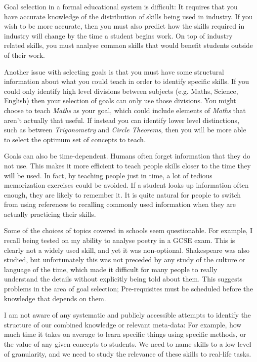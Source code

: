       Goal selection in a formal educational system is difficult: It requires that you have accurate knowledge of the distribution of skills being used in industry. If you wish to be more accurate, then you must also predict how the skills required in industry will change by the time a student begins work. On top of industry related skills, you must analyse common skills that would benefit students outside of their work.

      Another issue with selecting goals is that you must have some structural information about what you could teach in order to identify specific skills. If you could only identify high level divisions between subjects (e.g. Maths, Science, English) then your selection of goals can only use those divisions. You might choose to teach \emph{Maths} as your goal, which could include elements of \emph{Maths} that aren't actually that useful. If instead you can identify lower level distinctions, such as between \emph{Trigonometry} and \emph{Circle Theorems}, then you will be more able to select the optimum set of concepts to teach.

      Goals can also be time-dependent. Humans often forget information that they do not use. This makes it more efficient to teach people skills closer to the time they will be used. In fact, by teaching people just in time, a lot of tedious memorization exercises could be avoided. If a student looks up information often enough, they are likely to remember it. It is quite natural for people to switch from using references to recalling commonly used information when they are actually practicing their skills.

      Some of the choices of topics covered in schools seem questionable. For example, I recall being tested on my ability to analyse poetry in a GCSE exam. This is clearly not a widely used skill, and yet it was non-optional. Shakespeare was also studied, but unfortunately this was not preceded by any study of the culture or language of the time, which made it difficult for many people to really understand the details without explicitly being told about them. This suggests problems in the area of goal selection; Pre-requisites must be scheduled before the knowledge that depends on them.

      I am not aware of any systematic and publicly accessible attempts to identify the structure of our combined knowledge or relevant meta-data: For example, how much time it takes on average to learn specific things using specific methods, or the value of any given concepts to students. We need to name skills to a low level of granularity, and we need to study the relevance of these skills to real-life tasks.


